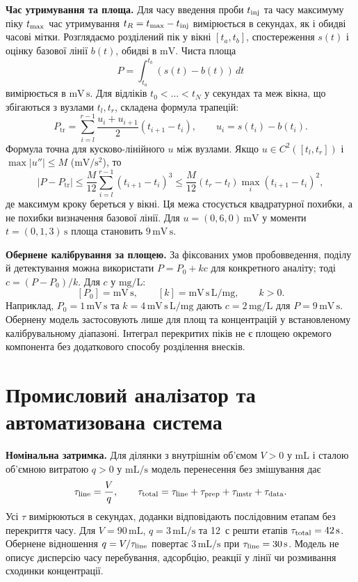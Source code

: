 \documentclass[11pt,a4paper]{article}
\newcommand{\unit}[1]{\,\mathrm{#1}}
\begin{document}
\textbf{Час утримування та площа.}
Для часу введення проби \(t_{\rm inj}\) та часу максимуму піку
\(t_{\rm max}\) час утримування \(t_R=t_{\rm max}-t_{\rm inj}\)
вимірюється в секундах, як і обидві часові мітки.
Розглядаємо розділений пік у вікні \([t_a,t_b]\),
спостереження \(s(t)\) і оцінку базової лінії \(b(t)\),
обидві в \(\mathrm{mV}\). Чиста площа
\[
    P=\int_{t_a}^{t_b}(s(t)-b(t))\,dt
\]
вимірюється в \(\mathrm{mV\,s}\).
Для відліків \(t_0<\dots<t_N\) у секундах та меж вікна, що
збігаються з вузлами \(t_l,t_r\), складена формула трапецій:
\[
   P_{\mathrm{tr}} =
   \sum_{i=l}^{r-1}\frac{u_i+u_{i+1}}{2}(t_{i+1}-t_i),
   \qquad u_i=s(t_i)-b(t_i).
\]
Формула точна для кусково-лінійного \(u\) між вузлами.
Якщо \(u\in C^2([t_l,t_r])\) і \(\max|u''|\le M\)
(\(\mathrm{mV/s^2}\)), то
\[
   |P-P_{\mathrm{tr}}|
     \le \frac{M}{12}\sum_{i=l}^{r-1}(t_{i+1}-t_i)^3
     \le \frac{M}{12}(t_r-t_l)\max_i(t_{i+1}-t_i)^2 ,
\]
де максимум кроку береться у вікні. Ця межа стосується
квадратурної похибки, а не похибки визначення базової лінії.
Для \(u=(0,6,0)\unit{mV}\) у моменти \(t=(0,1,3)\unit{s}\)
площа становить \(9\unit{mV\,s}\).

\textbf{Обернене калібрування за площею.}
За фіксованих умов пробовведення, поділу й детектування можна
використати \(P=P_0+kc\) для конкретного аналіту;
тоді \(c=(P-P_0)/k\). Для \(c\) у \(\mathrm{mg/L}\):
\[
   [P_0]=\mathrm{mV\,s},\qquad
   [k]=\mathrm{mV\,s\,L/mg},\qquad k>0 .
\]
Наприклад, \(P_0=1\unit{mV\,s}\) та \(k=4\unit{mV\,s\,L/mg}\)
дають \(c=2\unit{mg/L}\) для \(P=9\unit{mV\,s}\).
Обернену модель застосовують лише для площ та концентрацій
у встановленому калібрувальному діапазоні.
Інтеграл перекритих піків не є площею окремого компонента
без додаткового способу розділення внесків.

\section{Промисловий аналізатор та автоматизована система}

\textbf{Номінальна затримка.}
Для ділянки з внутрішнім об'ємом \(V>0\) у \(\mathrm{mL}\)
і сталою об'ємною витратою \(q>0\) у \(\mathrm{mL/s}\)
модель перенесення без змішування дає
\[
   \tau_{\rm line}=\frac{V}{q},\qquad
   \tau_{\rm total}=\tau_{\rm line}+
                      \tau_{\rm prep}+\tau_{\rm instr}+\tau_{\rm data}.
\]
Усі \(\tau\) вимірюються в секундах, доданки відповідають
послідовним етапам без перекриття часу.
Для \(V=90\unit{mL}\), \(q=3\unit{mL/s}\) та 12~с решти
етапів \(\tau_{\rm total}=42\unit{s}\).
Обернене відношення \(q=V/\tau_{\rm line}\) повертає
\(3\unit{mL/s}\) при \(\tau_{\rm line}=30\unit{s}\).
Модель не описує дисперсію часу перебування, адсорбцію,
реакції у лінії чи розмивання сходинки концентрації.
\end{document}
